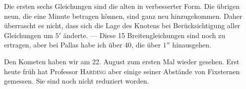 \par\indent Die ersten sechs Gleichungen sind die alten in verbesserter Form. Die übrigen neun, die eine Minute betragen können, sind ganz neu hinzugekommen. Daher überrascht es nicht, dass sich die Lage des Knotens bei Berücksichtigung aller Gleichungen um $5'$ änderte. — Diese 15 Breitengleichungen sind noch zu ertragen, aber bei Pallas habe ich über 40, die über $1''$ hinausgehen.\par
\indent Den Kometen haben wir am 22. August zum ersten Mal wieder gesehen. Erst heute früh hat Professor \textsc{Harding} aber einige seiner Abstände von Fixsternen gemessen. Sie sind noch nicht reduziert worden.
